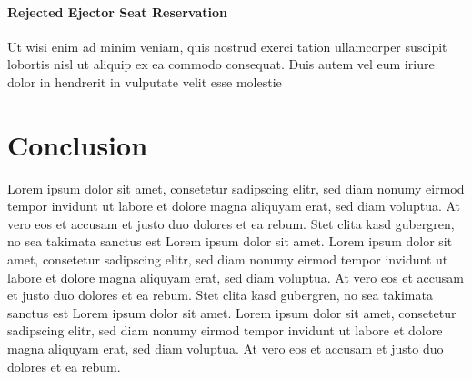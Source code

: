 \documentclass[journal]{vgtc}                %
\begin{document}
\paragraph{Rejected Ejector Seat Reservation}

Ut wisi enim ad minim veniam, quis nostrud exerci tation ullamcorper
suscipit lobortis nisl ut aliquip ex ea commodo consequat. Duis autem
vel eum iriure dolor in hendrerit in vulputate velit esse molestie


\section{Conclusion}

Lorem ipsum dolor sit amet, consetetur sadipscing elitr, sed diam
nonumy eirmod tempor invidunt ut labore et dolore magna aliquyam erat,
sed diam voluptua. At vero eos et accusam et justo duo dolores et ea
rebum. Stet clita kasd gubergren, no sea takimata sanctus est Lorem
ipsum dolor sit amet. Lorem ipsum dolor sit amet, consetetur
sadipscing elitr, sed diam nonumy eirmod tempor invidunt ut labore et
dolore magna aliquyam erat, sed diam voluptua. At vero eos et accusam
et justo duo dolores et ea rebum. Stet clita kasd gubergren, no sea
takimata sanctus est Lorem ipsum dolor sit amet. Lorem ipsum dolor sit
amet, consetetur sadipscing elitr, sed diam nonumy eirmod tempor
invidunt ut labore et dolore magna aliquyam erat, sed diam
voluptua. At vero eos et accusam et justo duo dolores et ea
rebum.



%

%
%
%


\end{document}
